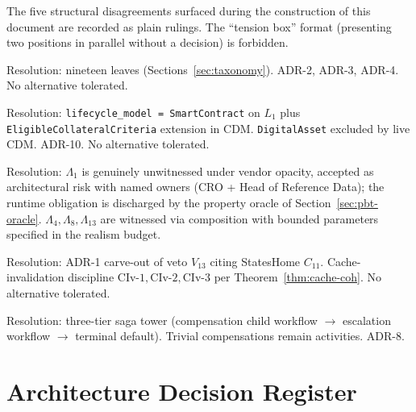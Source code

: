 \documentclass[11pt,a4paper]{article}
\begin{document}
The five structural disagreements surfaced during the construction of this document are recorded as plain rulings. The ``tension box'' format (presenting two positions in parallel without a decision) is forbidden.

\begin{description}[style=nextline]
\item[$D_1$ Leaf count] Resolution: nineteen leaves (Sections~\ref{sec:taxonomy}). ADR-2, ADR-3, ADR-4. No alternative tolerated.
\item[$D_2$ Tokenised collateral framing] Resolution: \texttt{lifecycle\_model = SmartContract} on $L_1$ plus \texttt{EligibleCollateralCriteria} extension in CDM. \texttt{DigitalAsset} excluded by live CDM. ADR-10. No alternative tolerated.
\item[$D_3$ Surrogate witnesses] Resolution: $\Lambda_1$ is genuinely unwitnessed under vendor opacity, accepted as architectural risk with named owners (CRO + Head of Reference Data); the runtime obligation is discharged by the property oracle of Section~\ref{sec:pbt-oracle}. $\Lambda_4, \Lambda_8, \Lambda_{13}$ are witnessed via composition with bounded parameters specified in the realism budget.
\item[$D_4$ Stored caches $L_5$, $L_6$] Resolution: ADR-1 carve-out of veto $V_{13}$ citing StatesHome $C_{11}$. Cache-invalidation discipline $\mathrm{CIv}\textrm{-}1, \mathrm{CIv}\textrm{-}2, \mathrm{CIv}\textrm{-}3$ per Theorem~\ref{thm:cache-coh}. No alternative tolerated.
\item[$D_5$ Compensations] Resolution: three-tier saga tower (compensation child workflow $\to$ escalation workflow $\to$ terminal default). Trivial compensations remain activities. ADR-8.
\end{description}

\clearpage
\section{Architecture Decision Register}
\label{sec:adr}
\end{document}

